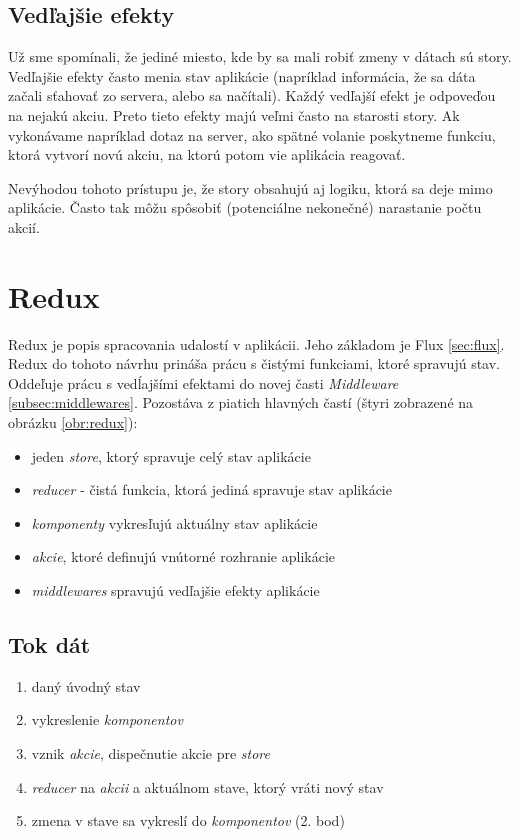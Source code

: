 \subsection{Vedľajšie efekty} 
Už sme spomínali, že jediné miesto, kde by sa mali robiť zmeny v dátach sú story. Vedľajšie efekty často menia stav aplikácie (napríklad informácia, že sa dáta začali sťahovať zo servera, alebo sa načítali). Každý vedľajší efekt je odpoveďou na nejakú akciu. Preto tieto efekty majú veľmi často na starosti story. Ak vykonávame napríklad dotaz na server, ako spätné volanie poskytneme funkciu, ktorá vytvorí novú akciu, na ktorú potom vie aplikácia reagovať.

Nevýhodou tohoto prístupu je, že story obsahujú aj logiku, ktorá sa deje mimo aplikácie. Často tak môžu spôsobiť (potenciálne nekonečné) narastanie počtu akcií.










\section{Redux}
Redux \cite{Redux} je popis spracovania udalostí v aplikácii. Jeho základom je Flux \ref{sec:flux}. Redux do tohoto návrhu prináša prácu s čistými funkciami, ktoré spravujú stav. Oddeľuje prácu s vedĺajšími efektami do novej časti \emph{Middleware} \ref{subsec:middlewares}. Pozostáva z piatich hlavných častí (štyri zobrazené na obrázku \ref{obr:redux}):
\begin{itemize}
\item jeden \emph{store}, ktorý spravuje celý stav aplikácie
\item \emph{reducer} - čistá funkcia, ktorá jediná spravuje stav aplikácie
\item \emph{komponenty} vykresľujú aktuálny stav aplikácie
\item \emph{akcie}, ktoré definujú vnútorné rozhranie aplikácie
\item \emph{middlewares} spravujú vedľajšie efekty aplikácie
\end{itemize}

\subsection{Tok dát}
\begin{enumerate}
\item daný úvodný stav
\item vykreslenie \emph{komponentov}
\item vznik \emph{akcie}, dispečnutie akcie pre \emph{store}
\item \emph{reducer} na \emph{akcii} a aktuálnom stave, ktorý vráti nový stav
\item zmena v stave sa vykreslí do \emph{komponentov} (2. bod)
\end{enumerate}

